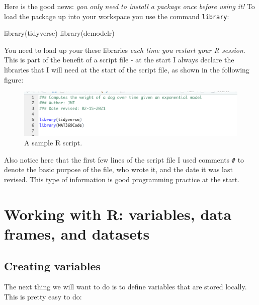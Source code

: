 \documentclass[
]{book}
\newenvironment{Shaded}{\begin{snugshade}}{\end{snugshade}}
\newcommand{\FunctionTok}[1]{\textcolor[rgb]{0.00,0.00,0.00}{#1}}
\newcommand{\NormalTok}[1]{#1}
\theoremstyle{definition}
\theoremstyle{definition}
\theoremstyle{definition}
\theoremstyle{remark}
\begin{document}
Here is the good news: \emph{you only need to install a package once before using it!} To load the package up into your workspace you use the command \texttt{library}:

\begin{Shaded}
\begin{Highlighting}[]
\FunctionTok{library}\NormalTok{(tidyverse)}
\FunctionTok{library}\NormalTok{(demodelr)}
\end{Highlighting}
\end{Shaded}

You need to load up your these libraries \emph{each time you restart your R session}. This is part of the benefit of a script file - at the start I always declare the libraries that I will need at the start of the script file, as shown in the following figure:

\begin{figure}

{\centering \includegraphics[width=5in]{figures/02-intro/sample-R-script} 

}

\caption{A sample R script.}\label{fig:unnamed-chunk-20}
\end{figure}

Also notice here that the first few lines of the script file I used comments \texttt{\#} to denote the basic purpose of the file, who wrote it, and the date it was last revised. This type of information is good programming practice at the start.

\hypertarget{working-with-r-variables-data-frames-and-datasets}{%
\section{Working with R: variables, data frames, and datasets}\label{working-with-r-variables-data-frames-and-datasets}}

\hypertarget{creating-variables}{%
\subsection{Creating variables}\label{creating-variables}}

The next thing we will want to do is to define variables that are stored locally. This is pretty easy to do:
\end{document}

